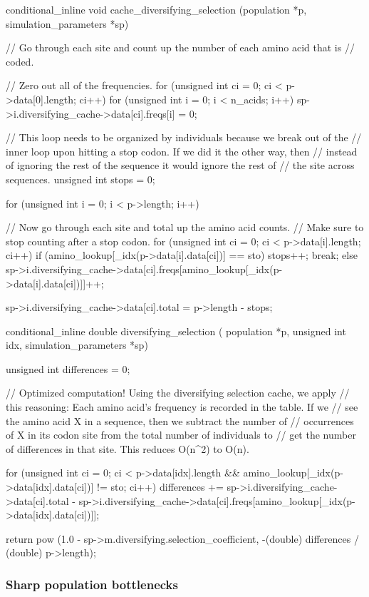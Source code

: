 \documentclass{article}
\begin{document}
\begin{ccode}
conditional_inline void cache_diversifying_selection (population *p,
			  simulation_parameters *sp) {
  // Go through each site and count up the number of each amino acid that is
  // coded.

  // Zero out all of the frequencies.
  for (unsigned int ci = 0; ci < p->data[0].length; ci++)
    for (unsigned int i = 0; i < n_acids; i++)
      sp->i.diversifying_cache->data[ci].freqs[i] = 0;

  // This loop needs to be organized by individuals because we break out of the
  // inner loop upon hitting a stop codon. If we did it the other way, then
  // instead of ignoring the rest of the sequence it would ignore the rest of
  // the site across sequences.
  unsigned int stops = 0;

  for (unsigned int i = 0; i < p->length; i++) {
    // Now go through each site and total up the amino acid counts.
    // Make sure to stop counting after a stop codon.
    for (unsigned int ci = 0; ci < p->data[i].length; ci++)
      if (amino_lookup[_idx(p->data[i].data[ci])] == sto) {
	stops++;
	break;
      } else
	sp->i.diversifying_cache->data[ci].freqs[amino_lookup[_idx(p->data[i].data[ci])]]++;

    sp->i.diversifying_cache->data[ci].total = p->length - stops;
  }
}

conditional_inline double diversifying_selection (
			    population *p, unsigned int idx,
			    simulation_parameters *sp) {
  unsigned int differences = 0;

  // Optimized computation! Using the diversifying selection cache, we apply
  // this reasoning: Each amino acid's frequency is recorded in the table. If we
  // see the amino acid X in a sequence, then we subtract the number of
  // occurrences of X in its codon site from the total number of individuals to
  // get the number of differences in that site. This reduces O(n^2) to O(n).

  for (unsigned int ci = 0;
       ci < p->data[idx].length && amino_lookup[_idx(p->data[idx].data[ci])] != sto;
       ci++)
    differences += sp->i.diversifying_cache->data[ci].total -
		   sp->i.diversifying_cache->data[ci].freqs[amino_lookup[_idx(p->data[idx].data[ci])]];

  return pow (1.0 - sp->m.diversifying.selection_coefficient,
	      -(double) differences / (double) p->length);
}
\end{ccode}

      \subsubsection{Sharp population bottlenecks}
\end{document}

